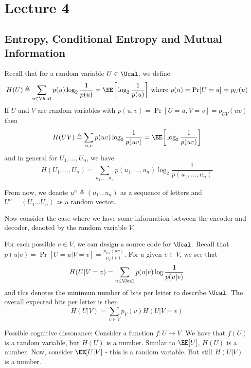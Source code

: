 \chapter{Lecture 4}
\section{Entropy, Conditional Entropy and Mutual Information}
Recall that for a random variable $U \in \Ucal$, we define
\[ H(U) \triangleq \sum_{u \in \Ucal} p(u) \log_2 \frac{1}{p(u)} = \EE\bigg[\log_2\frac{1}{p(u)}\bigg] \text{ where } p(u) = \Pr[U=u] = p_U(u)\]
If $U$ and $V$ are random variables with $p(u,v) = \Pr[U=u,V=v] = p_{UV}(uv)$ then \[H(UV) \triangleq \sum_{u,v} p(uv) \log_2 \frac{1}{p(uv)} = \EE\bigg[\log_2 \frac{1}{p(uv)}\bigg] \]
and in general for $U_1, \dots, U_n$, we have
\[H(U_1,\dots,U_n) = \sum_{u_1,\dots,u_n} p(u_1,\dots,u_n) \log_2\frac{1}{p(u_1,\dots,u_n)}\]
\begin{remark}
From now, we denote $u^n \triangleq (u_1\dots u_n)$ as a sequence of letters and $U^n = (U_1\dots U_n)$ as a random vector.
\end{remark}
Now consider the case where we have some information between the encoder and decoder, denoted by the random variable $V$. 
\begin{figure}[htb]
\centering
{}
\end{figure}
For each possible $v \in V$, we can design a source code for $\Ucal$. Recall that $p(u|v) = \Pr[U=u | V=v] = \frac{p_{UV}(uv)}{p_V(v)}$. For a given $v \in V$, we see that
\[ H(U|V=v) = \sum_{u\in\Ucal} p(u|v) \log \frac{1}{p(u|v)} \] and this denotes the minimum number of bits per letter to describe $\Ucal$. The overall expected bits per letter is then
\[H(U|V) = \sum_{v \in V} p_V(v) H(U|V=v)\]
\begin{remark}
Possible cognitive dissonance: Consider a function $f:U\to V$. We have that $f(U)$ is a random variable, but $H(U)$ is a number. Similar to $\EE[U]$, $H(U)$ is a number. Now, consider $\EE[U|V]$ - this is a random variable. But still $H(U|V)$ is a number.
\end{remark}
